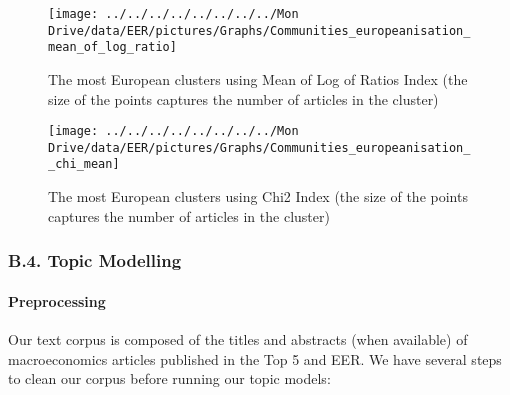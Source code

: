 \documentclass[
  12pt,
  onecolumn]{article}
\begin{document}
\begin{figure}[H]

{\centering \texttt{[image: ../../../../../../../../Mon Drive/data/EER/pictures/Graphs/Communities\_europeanisation\_mean\_of\_log\_ratio]} 

}

\caption{The most European clusters using Mean of Log of Ratios Index (the size of the points captures the number of articles in the cluster)}\label{fig:plot-mean-log-ratios}
\end{figure}

\begin{figure}[H]

{\centering \texttt{[image: ../../../../../../../../Mon Drive/data/EER/pictures/Graphs/Communities\_europeanisation\_\_chi\_mean]} 

}

\caption{The most European clusters using Chi2 Index (the size of the points captures the number of articles in the cluster)}\label{fig:plot-chi-two-mean}
\end{figure}

\hypertarget{topic}{%
\subsubsection*{B.4. Topic Modelling}\label{topic}}

\hypertarget{preprocessing}{%
\paragraph*{Preprocessing}\label{preprocessing}}

Our text corpus is composed of the titles and abstracts (when available)
of macroeconomics articles published in the Top 5 and EER. We have
several steps to clean our corpus before running our topic models:
\end{document}

